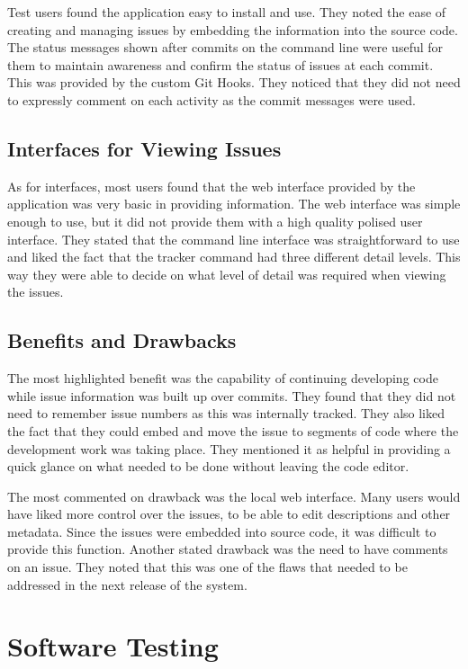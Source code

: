 \documentclass{mproj}
\begin{document}
Test users found the application easy to install and use. They noted the ease of creating and managing issues by embedding the information into the source code. The status messages shown after commits on the command line were useful for them to maintain awareness and confirm the status of issues at each commit. This was provided by the custom Git Hooks. They noticed that they did not need to expressly comment on each activity as the commit messages were used.

\subsection{Interfaces for Viewing Issues}

As for interfaces, most users found that the web interface provided by the application was very basic in providing information. The web interface was simple enough to use, but it did not provide them with a high quality polised user interface. They stated that the command line interface was straightforward to use and liked the fact that the tracker command had three different detail levels. This way they were able to decide on what level of detail was required when viewing the issues.

\subsection{Benefits and Drawbacks}

The most highlighted benefit was the capability of continuing developing code while issue information was built up over commits. They found that they did not need to remember issue numbers as this was internally tracked. They also liked the fact that they could embed and move the issue to segments of code where the development work was taking place. They mentioned it as helpful in providing a quick glance on what needed to be done without leaving the code editor.

The most commented on drawback was the local web interface. Many users would have liked more control over the issues, to be able to edit descriptions and other metadata. Since the issues were embedded into source code, it was difficult to provide this function. Another stated drawback was the need to have comments on an issue. They noted that this was one of the flaws that needed to be addressed in the next release of the system.


\section{Software Testing} 
\end{document}
